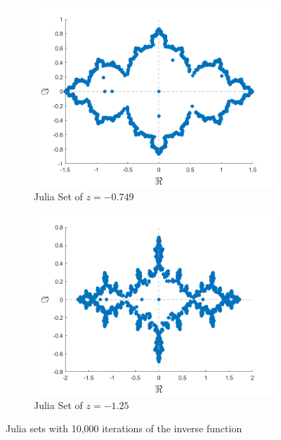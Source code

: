\documentclass[letterpaper,11pt]{article}
\begin{document}
\begin{figure}
	\begin{subfigure}[b]{0.49\textwidth}
		\includegraphics[width=\textwidth]{../Figures/Julia3.png}
		\caption{Julia Set of $z = - 0.749$}
		\label{fig:J-.749}
	\end{subfigure}
	\begin{subfigure}[b]{0.49\textwidth}
		\includegraphics[width=\textwidth]{../Figures/Julia4.png}
		\caption{Julia Set of $z = -1.25$}
		\label{fig:J-1.25}
	\end{subfigure}
	\caption{Julia sets with 10,000 iterations of the inverse function}
	\label{fig:Julia}
\end{figure}
\end{document}
